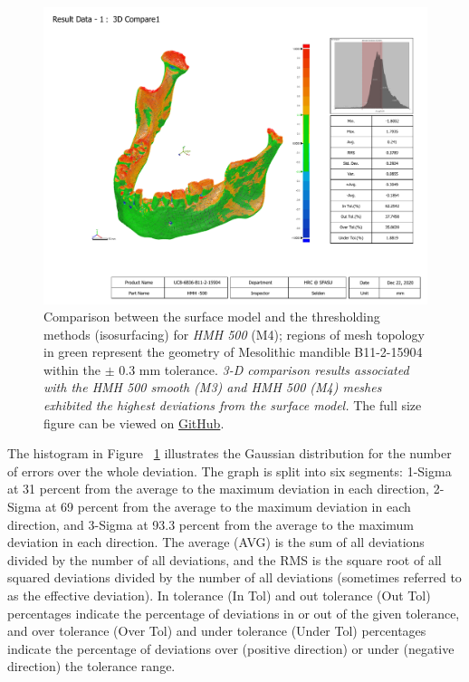 \documentclass[review]{elsarticle}
\begin{document}
\begin{figure}[ht]\centering
\includegraphics[width=\linewidth]{fig3.pdf}
\caption{Comparison between the surface model and the thresholding methods (isosurfacing) for \textit{HMH 500} (M4); regions of mesh topology in green represent the geometry of Mesolithic mandible B11-2-15904 within the $\pm$ 0.3 mm tolerance. \textit{3-D comparison results associated with the HMH 500 smooth (M3) and HMH 500 (M4) meshes exhibited the highest deviations from the surface model.} The full size figure can be viewed on \href{https://github.com/aksel-blaise/cai.mandible/blob/main/figures/fig3.pdf}{GitHub}.}
\label{fig:Fig3}
\end{figure}

The histogram in Figure ~\ref{fig:Fig3} illustrates the Gaussian distribution for the number of errors over the whole deviation. The graph is split into six segments: 1-Sigma at 31 percent from the average to the maximum deviation in each direction, 2-Sigma at 69 percent from the average to the maximum deviation in each direction, and 3-Sigma at 93.3 percent from the average to the maximum deviation in each direction. The average (AVG) is the sum of all deviations divided by the number of all deviations, and the RMS is the square root of all squared deviations divided by the number of all deviations (sometimes referred to as the effective deviation). In tolerance (In Tol) and out tolerance (Out Tol) percentages indicate the percentage of deviations in or out of the given tolerance, and over tolerance (Over Tol) and under tolerance (Under Tol) percentages indicate the percentage of deviations over (positive direction) or under (negative direction) the tolerance range. 
\end{document}
